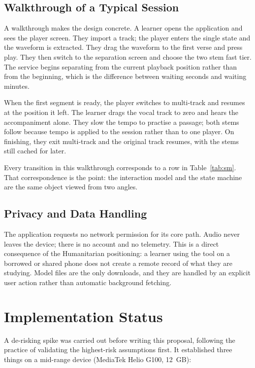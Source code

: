 \documentclass[letterpaper]{article} %
\begin{document}
\subsection{Walkthrough of a Typical Session}

A walkthrough makes the design concrete. A learner opens the application and
sees the player screen. They import a track; the player enters the single
state and the waveform is extracted. They drag the waveform to the first verse
and press play. They then switch to the separation screen and choose the two
stem fast tier. The service begins separating from the current playback
position rather than from the beginning, which is the difference between
waiting seconds and waiting minutes.

When the first segment is ready, the player switches to multi-track and resumes
at the position it left. The learner drags the vocal track to zero and hears
the accompaniment alone. They slow the tempo to practise a passage; both stems
follow because tempo is applied to the session rather than to one player. On
finishing, they exit multi-track and the original track resumes, with the
stems still cached for later.

Every transition in this walkthrough corresponds to a row in
Table~\ref{tab:sm}. That correspondence is the point: the interaction model and
the state machine are the same object viewed from two angles.

\subsection{Privacy and Data Handling}

The application requests no network permission for its core path. Audio never
leaves the device; there is no account and no telemetry. This is a
direct consequence of the Humanitarian positioning: a learner using the tool
on a borrowed or shared phone does not create a remote record of what they are
studying. Model files are the only downloads, and they are handled by an
explicit user action rather than automatic background fetching.

\section{Implementation Status}

A de-risking spike was carried out before writing this proposal, following the
practice of validating the highest-risk assumptions first. It established three
things on a mid-range device (MediaTek Helio G100, 12~GB):
\end{document}
